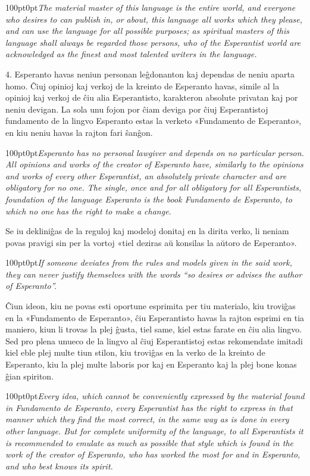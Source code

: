 \documentclass[11pt]{article}
\newcommand{\righty}[1]{\begin{adjustwidth}{100pt}{0pt}\it\traduko #1\end{adjustwidth}}
\begin{document}
\righty{The material master of this language is the entire world, and everyone who desires to can publish in, or about, this language all works which they please, and can use the language for all possible purposes; as spiritual masters of this language shall always be regarded those persons, who of the Esperantist world are acknowledged as the finest and most talented writers in the language.}

4. Esperanto havas neniun personan leĝdonanton kaj dependas de neniu aparta homo. Ĉiuj opinioj kaj verkoj de la kreinto de Esperanto havas, simile al la opinioj kaj verkoj de ĉiu alia Esperantisto, karakteron absolute privatan kaj por neniu devigan.  La sola unu fojon por ĉiam deviga por ĉiuj Esperantistoj fundamento de la lingvo Esperanto estas la verketo «Fundamento de Esperanto», en kiu neniu havas la rajton fari ŝanĝon.  

\righty{Esperanto has no personal lawgiver and depends on no particular person. All opinions and works of the creator of Esperanto have, similarly to the opinions and works of every other Esperantist, an absolutely private character and are obligatory for no one.  The single, once and for all obligatory for all Esperantists, foundation of the language Esperanto is the book \emph{Fundamento de Esperanto}, to which no one has the right to make a change.}

Se iu dekliniĝas de la reguloj kaj modeloj donitaj en la dirita verko, li neniam povas pravigi sin per la vortoj «tiel deziras aŭ konsilas la aŭtoro de Esperanto». 

\righty{If someone deviates from the rules and models given in the said work, they can never justify themselves with the words “so desires or advises the author of Esperanto”.}

Ĉiun ideon, kiu ne povas esti oportune esprimita per tiu materialo, kiu troviĝas en la «Fundamento de Esperanto», ĉiu Esperantisto havas la rajton esprimi en tia maniero, kiun li trovas la plej ĝusta, tiel same, kiel estas farate en ĉiu alia lingvo. Sed pro plena unueco de la lingvo al ĉiuj Esperantistoj estas rekomendate imitadi kiel eble plej multe tiun stilon, kiu troviĝas en la verko de la kreinto de Esperanto, kiu la plej multe laboris por kaj en Esperanto kaj la plej bone konas ĝian spiriton.

\righty{Every idea, which cannot be conveniently expressed by the material found in \emph{Fundamento de Esperanto}, every Esperantist has the right to express in that manner which they find the most correct, in the same way as is done in every other language. But for complete uniformity of the language, to all Esperantists it is recommended to emulate as much as possible that style which is found in the work of the creator of Esperanto, who has worked the most for and in Esperanto, and who best knows its spirit.}
\end{document}
